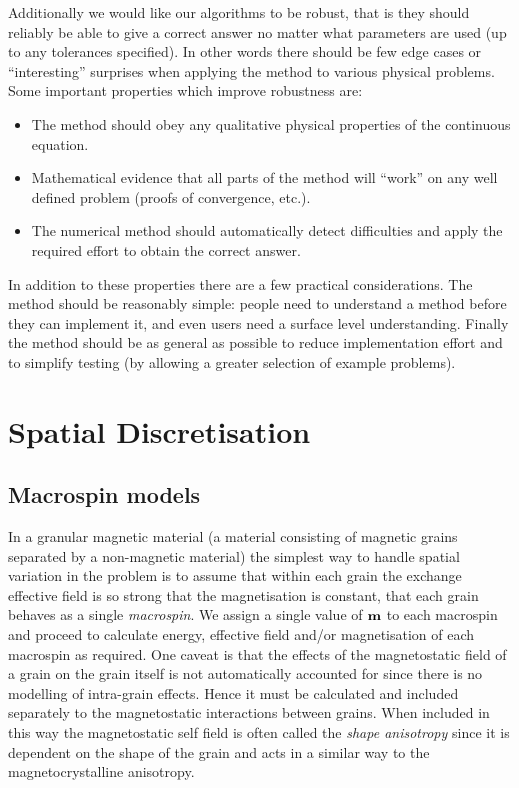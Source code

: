 Additionally we would like our algorithms to be robust, that is they should reliably be able to give a correct answer no matter what parameters are used (up to any tolerances specified).
In other words there should be few edge cases or ``interesting'' surprises when applying the method to various physical problems.
Some important properties which improve robustness are:
\begin{itemize}
\item The method should obey any qualitative physical properties of the continuous equation.

\item Mathematical evidence that all parts of the method will ``work'' on any well defined problem (\eg proofs of convergence, etc.).

\item The numerical method should automatically detect difficulties and apply the required effort to obtain the correct answer.
\end{itemize}


In addition to these properties there are a few practical considerations.
The method should be reasonably simple: people need to understand a method before they can implement it, and even users need a surface level understanding.
Finally the method should be as general as possible to reduce implementation effort and to simplify testing (by allowing a greater selection of example problems).


\section{Spatial Discretisation}
\label{sec:spat-discr}

\subsection{Macrospin models}
\label{sec:sd-macrospins}

In a granular magnetic material (a material consisting of magnetic grains separated by a non-magnetic material) the simplest way to handle spatial variation in the problem is to assume that within each grain the exchange effective field is so strong that the magnetisation is constant, \ie that each grain behaves as a single \emph{macrospin}.
We assign a single value of $\boldsymbol{\mathrm{m}}$ to each macrospin and proceed to calculate energy, effective field and/or magnetisation of each macrospin as required.
One caveat is that the effects of the magnetostatic field of a grain on the grain itself is not automatically accounted for since there is no modelling of intra-grain effects.
Hence it must be calculated and included separately to the magnetostatic interactions between grains.
When included in this way the magnetostatic self field is often called the \emph{shape anisotropy} since it is dependent on the shape of the grain and acts in a similar way to the magnetocrystalline anisotropy.

